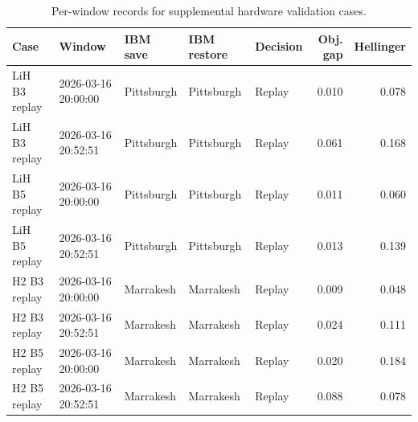 \begin{table}[t]
\centering
{}
\begin{tabular}{lllllrr}
\toprule
Case & Window & IBM save & IBM restore & Decision & Obj. gap & Hellinger \\
\midrule
LiH B3 replay & 2026-03-16 20:00:00 & Pittsburgh & Pittsburgh & Replay & 0.010 & 0.078 \\
LiH B3 replay & 2026-03-16 20:52:51 & Pittsburgh & Pittsburgh & Replay & 0.061 & 0.168 \\
LiH B5 replay & 2026-03-16 20:00:00 & Pittsburgh & Pittsburgh & Replay & 0.011 & 0.060 \\
LiH B5 replay & 2026-03-16 20:52:51 & Pittsburgh & Pittsburgh & Replay & 0.013 & 0.139 \\
H2 B3 replay & 2026-03-16 20:00:00 & Marrakesh & Marrakesh & Replay & 0.009 & 0.048 \\
H2 B3 replay & 2026-03-16 20:52:51 & Marrakesh & Marrakesh & Replay & 0.024 & 0.111 \\
H2 B5 replay & 2026-03-16 20:00:00 & Marrakesh & Marrakesh & Replay & 0.020 & 0.184 \\
H2 B5 replay & 2026-03-16 20:52:51 & Marrakesh & Marrakesh & Replay & 0.088 & 0.078 \\
\bottomrule
\end{tabular}
\caption{Per-window records for supplemental hardware validation cases.}
\label{tab:supplemental\_hw\_window\_records}
\end{table}
